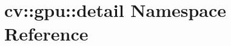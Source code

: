 \hypertarget{namespacecv_1_1gpu_1_1detail}{\section{cv\-:\-:gpu\-:\-:detail Namespace Reference}
\label{namespacecv_1_1gpu_1_1detail}
}
